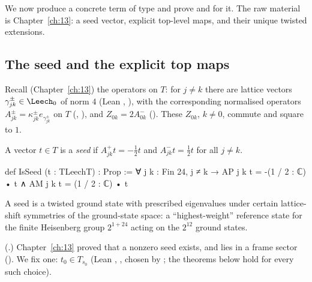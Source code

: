 We now produce a concrete term of type  and prove  and  for
it.  The raw material is Chapter~\ref{ch:13}: a seed vector, explicit top-level maps, and their unique
twisted extensions.

\subsection{The seed and the explicit top maps}

Recall (Chapter~\ref{ch:13}) the operators on $T$: for $j\ne k$ there are lattice vectors
$\gamma^\pm_{jk}\in\Leech_0$ of norm $4$ (Lean , ), with the corresponding
normalised operators $A^\pm_{jk}=\kappa^\pm_{jk}e_{\gamma^\pm_{jk}}$ on $T$ (, ), and
$Z_{0k}=2A^-_{0k}$ ().  These $Z_{0k}$, $k\ne0$, commute and square to $1$.

\begin{definition}[Seed]\label{ch14:def:seed}
A vector $t\in T$ is a \emph{seed} if $A^+_{jk}t=-\tfrac12t$ and $A^-_{jk}t=\tfrac12t$ for all $j\ne k$.
\end{definition}
\begin{leancode}
def IsSeed (t : TLeechT) : Prop :=
  ∀ j k : Fin 24, j ≠ k → AP j k t = -(1 / 2 : ℂ) • t ∧ AM j k t = (1 / 2 : ℂ) • t
\end{leancode}
\begin{physics}
A seed is a twisted ground state with prescribed eigenvalues under certain lattice-shift symmetries of the ground-state space: a ``highest-weight'' reference state for the finite Heisenberg group $2^{1+24}$ acting on the $2^{12}$ ground states.
\end{physics}

(.)  Chapter~\ref{ch:13} proved that a nonzero seed exists,
and lies in a frame sector ().  We fix one: $t_0\in T_{s_0}$
(Lean , , chosen by ; the theorems below hold for every such
choice).

